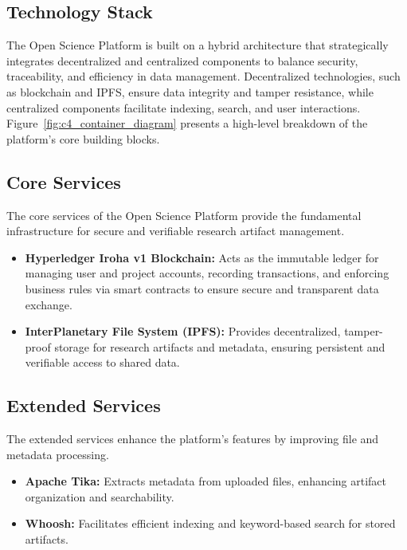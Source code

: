 \documentclass[final]{rc-book-2.14}
\begin{document}
\subsection{Technology Stack}
The Open Science Platform is built on a hybrid architecture that strategically integrates decentralized and centralized components to balance security, traceability, and efficiency in data management. Decentralized technologies, such as blockchain and IPFS, ensure data integrity and tamper resistance, while centralized components facilitate indexing, search, and user interactions. Figure~\ref{fig:c4_container_diagram} presents a high-level breakdown of the platform's core building blocks.

\subsection{Core Services}

The core services of the Open Science Platform provide the fundamental infrastructure for secure and verifiable research artifact management.

\begin{itemize}
    \item \textbf{Hyperledger Iroha v1 Blockchain:} Acts as the immutable ledger for managing user and project accounts, recording transactions, and enforcing business rules via smart contracts to ensure secure and transparent data exchange.
    \item \textbf{InterPlanetary File System (IPFS):} Provides decentralized, tamper-proof storage for research artifacts and metadata, ensuring persistent and verifiable access to shared data.
\end{itemize}

\subsection{Extended Services}

The extended services enhance the platform's features by improving file and metadata processing.

\begin{itemize}
    \item \textbf{Apache Tika:} Extracts metadata from uploaded files, enhancing artifact organization and searchability.
    \item \textbf{Whoosh:} Facilitates efficient indexing and keyword-based search for stored artifacts.
\end{itemize}
\end{document}
